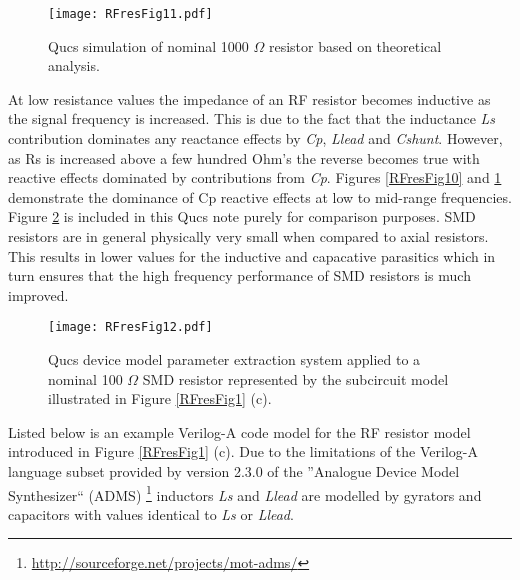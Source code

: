 \begin{figure}[h]
\begin{center}
	\texttt{[image: RFresFig11.pdf]}
	\caption{Qucs simulation of nominal 1000 $\Omega$ resistor based on theoretical analysis.}
	\label{RFresFig11}
\end{center}
\end{figure}
At low resistance values the impedance of an RF resistor becomes inductive as the signal frequency is increased.
This is due to the fact that the inductance \textit{Ls} contribution dominates any reactance effects by \textit{Cp}, \textit{Llead} and \textit{Cshunt}.
However, as Rs is increased above a few hundred Ohm's the reverse becomes true with reactive effects dominated by contributions from \textit{Cp}.
Figures  \ref{RFresFig10} and \ref{RFresFig11} demonstrate the dominance of Cp reactive effects at low to mid-range frequencies.
Figure \ref{RFresFig12} is included in this Qucs note purely for comparison purposes.  SMD resistors are in general physically very small when compared to axial resistors.
This results in lower values for the inductive and capacative parasitics which in turn ensures that the high frequency performance of SMD resistors is much improved.
\begin{figure}[b!]
\begin{center}
	\texttt{[image: RFresFig12.pdf]}
	\caption{Qucs device model parameter extraction system applied to a nominal 100 $\Omega$ SMD resistor represented by the subcircuit model illustrated in Figure \ref{RFresFig1} (c).}
	\label{RFresFig12}
\end{center}
\end{figure}
Listed below is an example Verilog-A code model for the RF resistor model introduced in Figure \ref{RFresFig1} (c).
Due to the limitations of the Verilog-A language subset provided by version 2.3.0 of the  ''Analogue Device Model Synthesizer`` (ADMS)
\footnote{ \url{http://sourceforge.net/projects/mot-adms/}} inductors
\textit{Ls} and  \textit{Llead} are modelled by gyrators and capacitors with values identical to \textit{Ls} or  \textit{Llead}.
